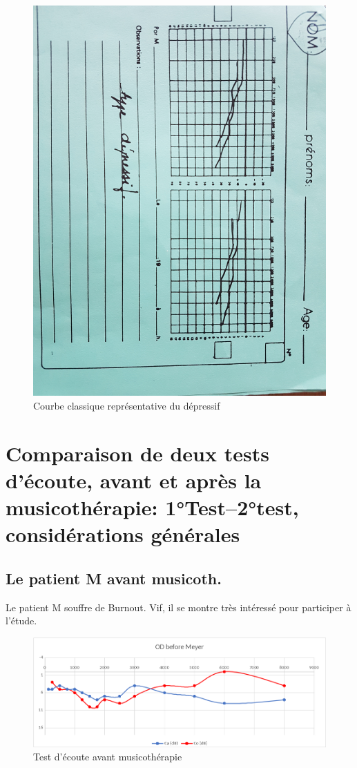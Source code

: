   \begin{figure}
	\centering
	\includegraphics[width=0.7\linewidth]{images/courbedepressif.jpg}
	\caption[Exemple d'une courbe de dépressif]{Courbe classique représentative du dépressif}
       
	\label{groupecontroleimage1}
\end{figure}




\section{Comparaison de deux tests d'écoute, avant et après la musicothérapie: 1°Test--2°test, considérations générales}
	
 	
\subsection{Le patient M avant musicoth.}

 	Le patient M souffre de Burnout. Vif, il se montre très
        intéressé pour participer à l'étude.
 
 	
 	\begin{figure}[tbh]
 		\centering
 		\includegraphics[width=0.7\linewidth]{images/clinique/od_before_meyer.png}
 		\caption{Test d'écoute avant musicothérapie}
 		\label{fig:odbeforemeyer}
 	\end{figure}
 	
